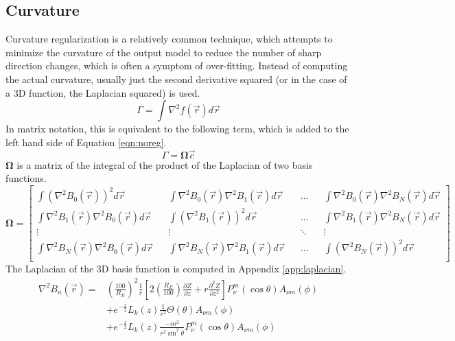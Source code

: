 \documentclass[12pt,letterpaper]{article}
\newcommand{\mat}[1]{\mathbf{#1}}
\begin{document}
  \subsection{Curvature}
    Curvature regularization is a relatively common technique, which attempts to minimize the curvature of the output model to reduce the number of sharp direction changes, which is often a symptom of over-fitting.  Instead of computing the actual curvature, usually just the second derivative squared (or in the case of a 3D function, the Laplacian squared) is used.
    \begin{equation}
      \label{eqn:residualcurvature}
      \Gamma = \int \nabla^2f(\vec{r})d\vec{r}
    \end{equation}
    In matrix notation, this is equivalent to the following term, which is added to the left hand side of Equation \ref{eqn:noreg}.
    \begin{equation}
      \label{eqn:curvereg}
      \Gamma = \mat{\Omega}\vec{c}
    \end{equation}
    \(\mat{\Omega}\) is a matrix of the integral of the product of the Laplacian of two basis functions.
    \begin{equation}
      \label{eqn:defOmg}
      \mat{\Omega} = \begin{bmatrix}
                  \int (\nabla^2B_0(\vec{r}))^2 d\vec{r} && \int \nabla^2B_0(\vec{r})\nabla^2B_1(\vec{r}) d\vec{r} && \hdots && \int \nabla^2B_0(\vec{r})\nabla^2B_N(\vec{r}) d\vec{r} \\
                  \int \nabla^2 B_1(\vec{r})\nabla^2 B_0(\vec{r}) d\vec{r} && \int (\nabla^2B_1(\vec{r}))^2 d\vec{r} && \hdots && \int \nabla^2B_1(\vec{r})\nabla^2B_N(\vec{r}) d\vec{r} \\
                  \vdots && \vdots && \ddots && \vdots \\
                  \int \nabla^2 B_N(\vec{r})\nabla^2 B_0(\vec{r}) d\vec{r} && \int \nabla^2B_N(\vec{r})\nabla^2B_1(\vec{r}) d\vec{r} && \hdots && \int (\nabla^2B_N(\vec{r}))^2 d\vec{r} \\
                \end{bmatrix}
    \end{equation}
    The Laplacian of the 3D basis function is computed in Appendix \ref{app:laplacian}.
    \begin{align}
      \label{eqn:fulllaplacian}
      \nabla^2B_n(\vec{r}) =& \left(\frac{100}{R_E}\right)^2\frac{1}{r}\left[2\left(\frac{R_E}{100}\right)\frac{\partial Z}{\partial z}+r\frac{\partial^2 Z}{\partial z^2}\right]P_\nu^m(\cos\theta)A_{\nu m}(\phi) \\
      &+ e^{-\frac{z}{2}}L_k(z)\frac{1}{r^2}\Theta(\theta)A_{\nu m}(\phi) \\
      &+ e^{-\frac{z}{2}}L_k(z)\frac{-m^2}{r^2\sin^2\theta}P_\nu^m(\cos\theta)A_{\nu m}(\phi)
    \end{align}
\end{document}
